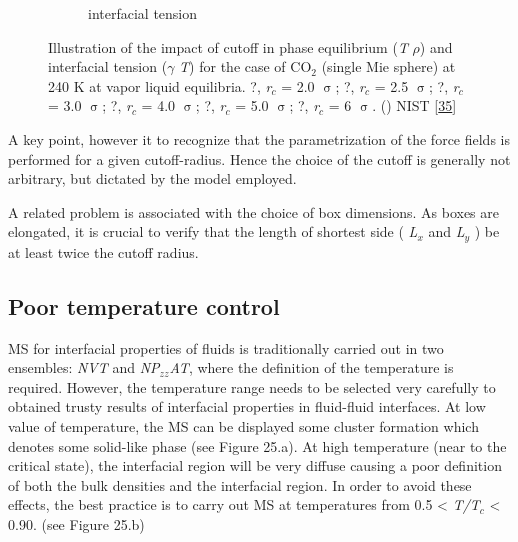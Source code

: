 \documentclass[9pt,bestpractices]{livecoms}
\begin{document}
\begin{figure}
\begin{subfigure}{0.2\textwidth}
    \caption{interfacial tension}
	\end{subfigure}
\caption{Illustration of the impact of cutoff in phase equilibrium (\textit{T}
\textendash{} {${\rho}$}) and interfacial tension ({${\gamma}$} \textendash{}
\textit{T}) for the case of CO$_{2}$ (single Mie sphere) at 240 K at vapor
\textendash{} liquid equilibria. ?, \textit{r}$_{c}$ = 2.0 {${\upsigma}$}; ?,
\textit{r}$_{c}$ = 2.5 {${\upsigma}$}; ?, \textit{r}$_{c}$ = 3.0
{${\upsigma}$}; ?, \textit{r}$_{c}$ = 4.0 {${\upsigma}$}; ?, \textit{r}$_{c}$
= 5.0 {${\upsigma}$}; ?, \textit{r}$_{c}$ = 6 {${\upsigma}$}. (\textemdash{})
NIST [{\hyperref[ref-011]{35}}]
}
\label{fig:24}
\end{figure}

A key point, however it to recognize that the parametrization of the force
fields is performed for a given cutoff-radius. Hence the choice of the cutoff
is generally not arbitrary, but dictated by the model employed. 

A related problem is associated with the choice of box dimensions. As boxes are
elongated, it is crucial to verify that the length of shortest side
( \textit{L}$_{x}$ and \textit{L}$_{y}$ ) be at least twice the cutoff radius.

\subsection{Poor temperature control}

MS for interfacial properties of fluids is traditionally carried out in two
ensembles: \textit{NVT} and \textit{NP}$_{zz}$\textit{AT}, where the definition
of the temperature is required. However, the temperature range needs to be
selected very carefully to obtained trusty results of interfacial properties in
fluid-fluid interfaces. At low value of temperature, the MS can be displayed
some cluster formation which denotes some solid-like phase (see Figure 25.a).
At high temperature (near to the critical state), the interfacial region will
be very diffuse causing a poor definition of both the bulk densities and the
interfacial region. In order to avoid these effects, the best practice is to
carry out MS at temperatures from 0.5 {\textless} \textit{T/T}$_{c}$
{\textless} 0.90. (see Figure 25.b) 
\end{document}
